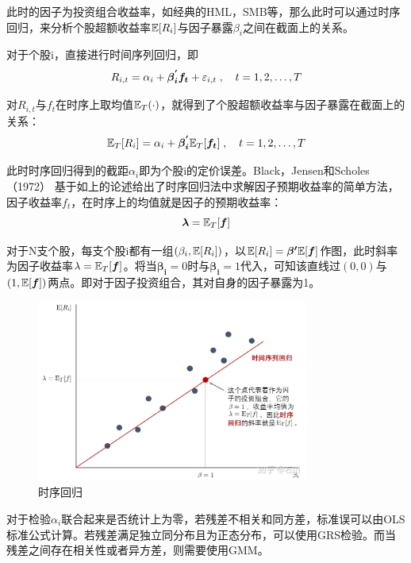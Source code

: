 \documentclass[11pt]{article}
\begin{document}
此时的因子为投资组合收益率，如经典的HML，SMB等，那么此时可以通过时序回归，来分析个股超额收益率$\mathbb{E}[R_i]$与因子暴露$\beta_i$之间在截面上的关系。

对于个股i，直接进行时间序列回归，即
\begin{equation*}
    R_{i,t} = \alpha_i + \bm{\beta_{i}^{'} f_t} + \varepsilon_{i,t} \;,\quad t=1,2,\dots,T
\end{equation*}

对$R_{i,t}$与$f_t$在时序上取均值$\mathbb{E}_T(\cdot)$，就得到了个股超额收益率与因子暴露在截面上的关系：
\begin{equation*}
    \mathbb{E}_T[R_i] = \alpha_i + \bm{\beta_{i}^{'}} \mathbb{E}_T[\bm{f_t}] \;,\quad t=1,2,\dots,T
\end{equation*}

此时时序回归得到的截距$\alpha_i$即为个股i的定价误差。Black，Jensen和Scholes（1972） 基于如上的论述给出了时序回归法中求解因子预期收益率的简单方法，因子收益率$f_t$，在时序上的均值就是因子的预期收益率：
\begin{equation*}
    \bm{\lambda} = \mathbb{E}_T[\bm{f}]
\end{equation*}

对于N支个股，每支个股i都有一组$(\beta_i,\mathbb{E}[R_i])$，以$\mathbb{E}[R_i] = \bm{\beta'} \mathbb{E}[\bm{f}]$作图，此时斜率为因子收益率$\lambda=\mathbb{E}_T[\bm{f}]$。将当$\bm{\beta_i}=0$时与$\bm{\beta_i}=1$代入，可知该直线过$(0,0)$与$(1,\mathbb{E}[\bm{f}])$两点。即对于因子投资组合，其对自身的因子暴露为1。

\begin{figure}[H]
    \centering
    \includegraphics[width=0.8\textwidth]{fig/ts_reg.jpg}
    \caption{时序回归}
    \label{fig：ts_reg}
\end{figure}

对于检验$\alpha_i$联合起来是否统计上为零，若残差不相关和同方差，标准误可以由OLS标准公式计算。若残差满足独立同分布且为正态分布，可以使用GRS检验。而当残差之间存在相关性或者异方差，则需要使用GMM。
\end{document}
